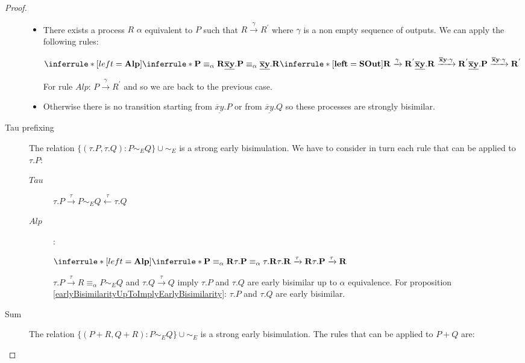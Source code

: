 \begin{lemma}
\begin{proof}
\begin{description}
\begin{itemize}
	  \item
	    There exists a process $R$ $\alpha$ equivalent to $P$ such that $R \xrightarrow{\gamma} R^{'}$ where $\gamma$ is a non empty sequence of outputs. We can apply the following rules:
	    \begin{center}
	      $\inferrule* [left=\bf{Alp}]{
		  \inferrule* {
		    P \equiv_{\alpha} R
		  }{
		    \underline{\overline{x}y}.P \equiv_{\alpha} \underline{\overline{x}y}.R
		  }
		\\
		  \inferrule* [left=\bf{SOut}]{
		    R \xrightarrow{\gamma} R^{'}
		  }{
		    \underline{\overline{x}y}.R \xrightarrow{\overline{x}y \cdot \gamma} R^{'}
		  }
	      }{
		\underline{\overline{x}y}.P \xrightarrow{\overline{x}y \cdot \gamma} R^{'}
	      }$
	    \end{center}
	    For rule $Alp$: $P \xrightarrow{\gamma} R^{'}$ and so we are back to the previous case.
	  \item
	    Otherwise there is no transition starting from $\underline{\overline{x}y}.P$ or from $\underline{\overline{x}y}.Q$ so these processes are strongly bisimilar.
	\end{itemize}
      \item[Tau prefixing]
	The relation $\{(\tau.P, \tau.Q): P\sim_{E} Q\} \cup \sim_{E}$ is a strong early bisimulation. We have to consider in turn each rule that can be applied to $\tau.P$:
	\begin{description}
	  \item[$Tau$]
	    $\tau.P \xrightarrow{\tau} P \sim_{E} Q \stackrel{\tau}{\longleftarrow} \tau.Q$
	  \item[$Alp$]:
	    \begin{center}
	      $\inferrule* [left=\bf{Alp}]{
		  \inferrule* {
		    P \equiv_{\alpha} R
		  }{
		    \tau.P \equiv_{\alpha} \tau.R
		  }
		\\
		  \tau.R \xrightarrow{\tau} R
	      }{
		  \tau.P \xrightarrow{\tau} R
	      }$
	    \end{center}
	    $\tau.P \xrightarrow{\tau} R \equiv_{\alpha} P \sim_{E} Q$ and $\tau.Q \xrightarrow{\tau} Q$ imply $\tau.P$ and $\tau.Q$ are early bisimilar up to $\alpha$ equivalence. For proposition \ref{earlyBisimilarityUpToImplyEarlyBisimilarity}: $\tau.P$ and $\tau.Q$ are early bisimilar.	    
	\end{description}
      \item[Sum]
	The relation $\{(P+R, Q+R): P\sim_{E} Q\} \cup \sim_{E}$ is a strong early bisimulation. The rules that can be applied to $P+Q$ are:
	\begin{description}

\end{description}
\end{description}
\end{proof}
\end{lemma}
